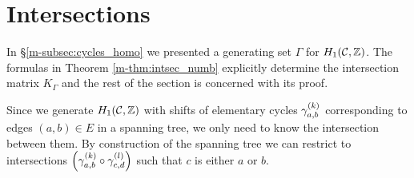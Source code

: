\documentclass[main.tex]{subfiles}
\begin{document}
  \section{Intersections}\label{sec:intersections}

  In \S \ref{m-subsec:cycles_homo} we presented a generating set $\Gamma$ for $H_1(\mathcal{C},\mathbb{Z})$.
  The formulas in Theorem \ref{m-thm:intsec_numb} explicitly determine the
  intersection matrix $K_{\Gamma}$ and
  the rest of the section is concerned with its proof.



  Since we generate $H_1(\mathcal{C},\mathbb{Z})$ with shifts of elementary cycles $\gamma_{a,b}^{(k)}$ corresponding to edges $(a,b) \in E$ in a spanning tree, we only need to know the intersection between them.
  By construction of the spanning tree we can restrict to intersections $\left(\gamma_{a,b}^{(k)} \circ \gamma_{c,d}^{(l)}\right)$ such that $c$ is either $a$ or $b$.
\end{document}
